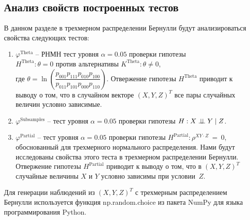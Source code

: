 \newpage
\subsection{Анализ свойств построенных тестов}\label{numerical_exp}

В данном разделе в трехмерном
распределении Бернулли
будут анализироваться свойства
следующих тестов:
\begin{enumerate}
    \item $\varphi^{\text{Theta}}$ -- РНМН тест уровня 
    $\alpha=0.05$ проверки гипотезы \\
    $H^{\text{Theta}}: \theta=0$
    против альтернативы $K^{\text{Theta}}: \theta\neq 0$, \\ где
     $\theta = \ln  \left(\dfrac{p_{001}p_{111}p_{010}p_{100}}{p_{011}p_{101}p_{000}p_{110}}\right)$.
     Отвержение гипотезы $H^{\text{Theta}}$ приводит к выводу
     о том, 
     что в случайном векторе $(X,Y,Z)^T$ все пары случайных величин условно зависимые.
    \item $\varphi^{\text{Subsamples}}$ -- тест уровня $\alpha=0.05$
    проверки гипотезы $H: X \perp\!\!\!\perp Y \mid Z$.
    \item $\varphi^{\text{Partial}}$ -- тест уровня $\alpha=0.05$
    проверки гипотезы $H^{\text{Partial}}: \rho^{XY\cdot Z}~=~0$,
    обоснованный для трехмерного нормального распределения.
    Нами будут исследованы свойства этого теста в трехмерном
    распределении Бернулли. Отвержение гипотезы 
    $H^{\text{Partial}}$ приводит к выводу о том, что 
    в  $(X,Y,Z)^T$ случайные величины
    $X$ и $Y$ условно зависимы при условии~$Z$.

\end{enumerate}

Для генерации наблюдений из $(X,Y,Z)^T$ 
с трехмерным распределением Бернулли
используется 
функция np.random.choice из пакета NumPy
для языка программирования Python. 

